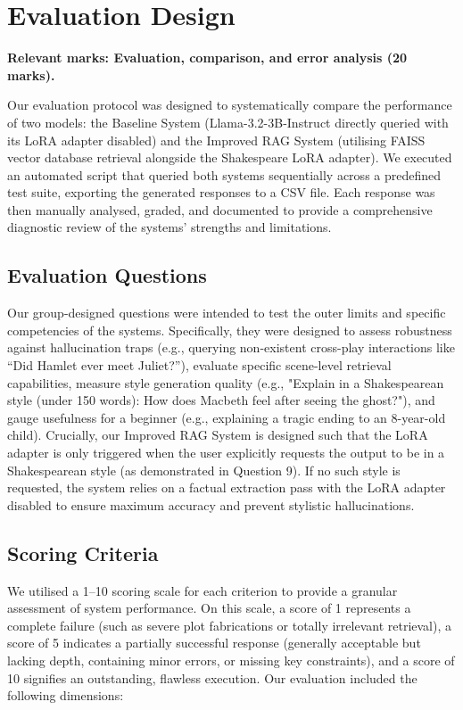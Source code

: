 \documentclass[10pt,conference]{IEEEtran}
\begin{document}
\section{Evaluation Design}
\label{sec:evaluation-design}

\textbf{Relevant marks: Evaluation, comparison, and error analysis (20 marks).}

Our evaluation protocol was designed to systematically compare the performance of two models: the Baseline System (Llama-3.2-3B-Instruct directly queried with its LoRA adapter disabled) and the Improved RAG System (utilising FAISS vector database retrieval alongside the Shakespeare LoRA adapter). We executed an automated script that queried both systems sequentially across a predefined test suite, exporting the generated responses to a CSV file. Each response was then manually analysed, graded, and documented to provide a comprehensive diagnostic review of the systems' strengths and limitations.
\subsection{Evaluation Questions}

Our group-designed questions were intended to test the outer limits and specific competencies of the systems. Specifically, they were designed to assess robustness against hallucination traps (e.g., querying non-existent cross-play interactions like “Did Hamlet ever meet Juliet?”), evaluate specific scene-level retrieval capabilities, measure style generation quality (e.g., "Explain in a Shakespearean style (under 150 words): How does Macbeth feel after seeing the ghost?"), and gauge usefulness for a beginner (e.g., explaining a tragic ending to an 8-year-old child). Crucially, our Improved RAG System is designed such that the LoRA adapter is only triggered when the user explicitly requests the output to be in a Shakespearean style (as demonstrated in Question 9). If no such style is requested, the system relies on a factual extraction pass with the LoRA adapter disabled to ensure maximum accuracy and prevent stylistic hallucinations.

\subsection{Scoring Criteria}

We utilised a 1–10 scoring scale for each criterion to provide a granular assessment of system performance. On this scale, a score of 1 represents a complete failure (such as severe plot fabrications or totally irrelevant retrieval), a score of 5 indicates a partially successful response (generally acceptable but lacking depth, containing minor errors, or missing key constraints), and a score of 10 signifies an outstanding, flawless execution.
Our evaluation included the following dimensions:
\end{document}
